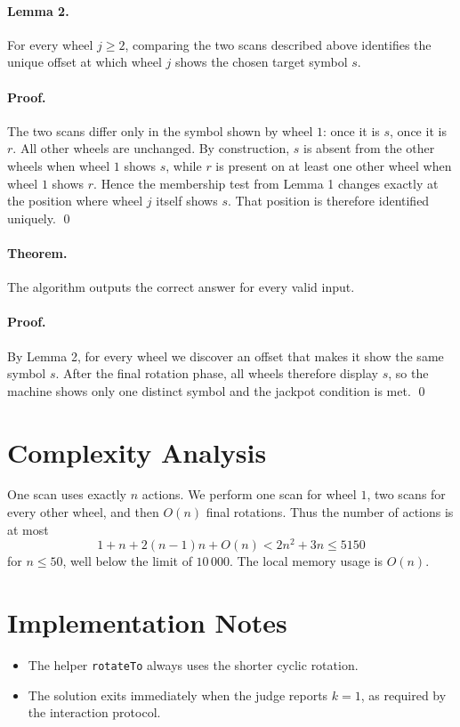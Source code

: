 \documentclass[11pt]{article}
\begin{document}
\paragraph{Lemma 2.}
For every wheel $j \ge 2$, comparing the two scans described above identifies the unique offset at which
wheel $j$ shows the chosen target symbol $s$.

\paragraph{Proof.}
The two scans differ only in the symbol shown by wheel $1$: once it is $s$, once it is $r$.
All other wheels are unchanged. By construction, $s$ is absent from the other wheels when wheel $1$
shows $s$, while $r$ is present on at least one other wheel when wheel $1$ shows $r$.
Hence the membership test from Lemma 1 changes exactly at the position where wheel $j$ itself shows
$s$. That position is therefore identified uniquely. \qed

\paragraph{Theorem.}
The algorithm outputs the correct answer for every valid input.

\paragraph{Proof.}
By Lemma 2, for every wheel we discover an offset that makes it show the same symbol $s$.
After the final rotation phase, all wheels therefore display $s$, so the machine shows only one distinct
symbol and the jackpot condition is met. \qed

\section*{Complexity Analysis}

One scan uses exactly $n$ actions. We perform one scan for wheel $1$, two scans for every other wheel,
and then $O(n)$ final rotations. Thus the number of actions is at most
\[
1 + n + 2(n-1)n + O(n) < 2n^2 + 3n \le 5150
\]
for $n \le 50$, well below the limit of $10\,000$. The local memory usage is $O(n)$.

\section*{Implementation Notes}

\begin{itemize}[leftmargin=*]
    \item The helper \texttt{rotateTo} always uses the shorter cyclic rotation.
    \item The solution exits immediately when the judge reports $k=1$, as required by the interaction
    protocol.
\end{itemize}
\end{document}
